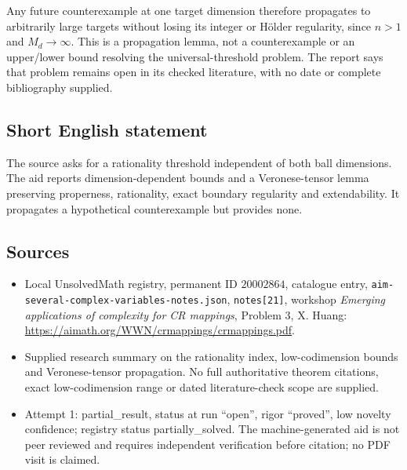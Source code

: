 \documentclass[11pt]{article}
\begin{document}
Any future counterexample at one target dimension therefore propagates to arbitrarily large targets without losing its integer or H\"older regularity, since \(n>1\) and \(M_d\to\infty\). This is a propagation lemma, not a counterexample or an upper/lower bound resolving the universal-threshold problem. The report says that problem remains open in its checked literature, with no date or complete bibliography supplied.
\subsection{Short English statement}
The source asks for a rationality threshold independent of both ball dimensions. The aid reports dimension-dependent bounds and a Veronese-tensor lemma preserving properness, rationality, exact boundary regularity and extendability. It propagates a hypothetical counterexample but provides none.
\subsection{Sources}
\begin{itemize}
\item Local UnsolvedMath registry, permanent ID \(20002864\), catalogue entry, \texttt{aim-several-complex-variables-notes.json}, \texttt{notes[21]}, workshop \emph{Emerging applications of complexity for CR mappings}, Problem 3, X. Huang: \url{https://aimath.org/WWN/crmappings/crmappings.pdf}.
\item Supplied research summary on the rationality index, low-codimension bounds and Veronese-tensor propagation. No full authoritative theorem citations, exact low-codimension range or dated literature-check scope are supplied.
\item Attempt 1: partial\_result, status at run ``open'', rigor ``proved'', low novelty confidence; registry status partially\_solved. The machine-generated aid is not peer reviewed and requires independent verification before citation; no PDF visit is claimed.
\end{itemize}
\end{document}
